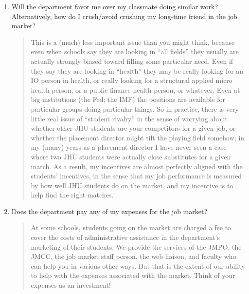 \documentclass{\classes/econtex}
\begin{document}
\begin{enumerate}
\begin{quote}
    As of the fall of 2017 -- not rechecked since, and the paragraph above shows this area does change -- it was my understanding that the Board and the Banks sponsor people for Green cards after three years of employment.  (This seems to have changed over time, so if it is important to your job choice then you should verify it).

  \end{quote}
\item  Will the department favor me over my classmate doing similar work?  Alternatively, how do I crush/avoid crushing my long-time friend in the job market?

  \begin{quote}
    This is a (much) less important issue than you might think, because even when schools say they are looking in ``all fields'' they usually are actually strongly biased toward filling some particular need.  Even if they say they are looking in ``health'' they may be really looking for an IO person in health, or really looking for a structural applied micro health person, or a public finance health person, or whatever.  Even at big institutions (the Fed; the IMF) the positions are available for particular groups doing particular things.  So in practice, there is very little real issue of ``student rivalry'' in the sense of worrying about whether other JHU students are your competitors for a given job, or whether the placement director might tilt the playing field somehow; in my (many) years as a placement director I have never seen a case where two JHU students were actually close substitutes for a given match.  As a result, my incentives are almost perfectly aligned with the students' incentives, in the sense that my job performance is measured by how well JHU students do on the market, and my incentive is to help find the right matches.

  \end{quote}

\item  Does the department pay any of my expenses for the job market?

  \begin{quote}  
    At some schools, students going on the market are charged a fee to cover the costs of administrative assistance in the department's marketing of their students.  We provide the services of the JMPO, the JMCC, the job market staff person, the web liaison, and faculty who can help you in various other ways.  But that is the extent of our ability to help with the expenses associated with the market.  Think of your expenses as an investment!


\end{quote}
\end{enumerate}
\end{document}
